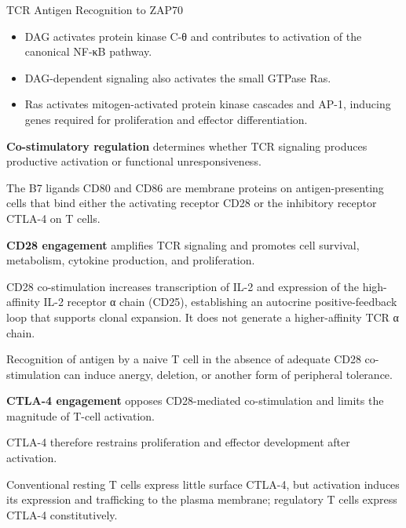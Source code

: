 \begin{core}{TCR Antigen Recognition to ZAP70}
\begin{enumerate}[label=(\arabic*)]
\begin{itemize}
          \item DAG activates protein kinase C-θ and contributes to activation of the canonical NF-κB pathway.

          \item DAG-dependent signaling also activates the small GTPase Ras.

          \item Ras activates mitogen-activated protein kinase cascades and AP-1, inducing genes required for proliferation and effector differentiation.

        \end{itemize}

      \end{enumerate}

      \textbf{Co-stimulatory regulation} determines whether TCR signaling produces productive activation or functional unresponsiveness.

      The B7 ligands CD80 and CD86 are membrane proteins on antigen-presenting cells that bind either the activating receptor CD28 or the inhibitory receptor CTLA-4 on T cells.

      \textbf{CD28 engagement} amplifies TCR signaling and promotes cell survival, metabolism, cytokine production, and proliferation.

      CD28 co-stimulation increases transcription of IL-2 and expression of the high-affinity IL-2 receptor α chain (CD25), establishing an autocrine positive-feedback loop that supports clonal expansion. It does not generate a higher-affinity TCR α chain.

      Recognition of antigen by a naive T cell in the absence of adequate CD28 co-stimulation can induce anergy, deletion, or another form of peripheral tolerance.

      \textbf{CTLA-4 engagement} opposes CD28-mediated co-stimulation and limits the magnitude of T-cell activation.

      CTLA-4 therefore restrains proliferation and effector development after activation.

      Conventional resting T cells express little surface CTLA-4, but activation induces its expression and trafficking to the plasma membrane; regulatory T cells express CTLA-4 constitutively.

    \end{core}

